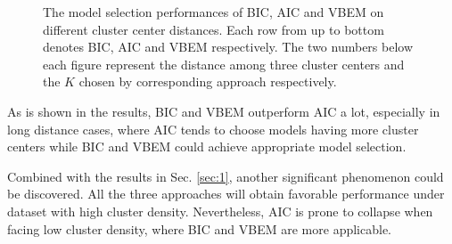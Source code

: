\documentclass[12pt,a4paper]{article}
\theoremstyle{definition}
\begin{document}
\begin{figure}[H]
{	}
	\caption{The model selection performances of BIC, AIC and VBEM on different cluster center distances. Each row from up to bottom denotes BIC, AIC and VBEM respectively. The two numbers below each figure represent the distance among three cluster centers and the $K$ chosen by corresponding approach respectively.}
	\label{fig:dis}
\end{figure}

As is shown in the results, BIC and VBEM outperform AIC a lot, especially in long distance cases, where AIC tends to choose models having more cluster centers while BIC and VBEM could achieve appropriate model selection.

Combined with the results in Sec. \ref{sec:1}, another significant phenomenon could be discovered. All the three approaches will obtain favorable performance under dataset with high cluster density. Nevertheless, AIC is prone to collapse when facing low cluster density, where BIC and VBEM are more applicable.
\end{document}
